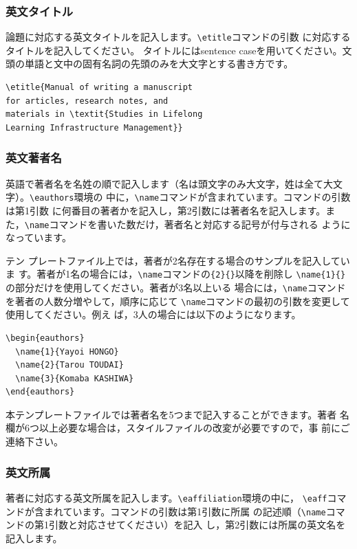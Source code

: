 \documentclass[b5paper,10pt,twocolumn,tombow]{jarticle}
\begin{document}
\subsubsection{英文タイトル}
論題に対応する英文タイトルを記入します。\verb|\etitle|コマンドの引数
に対応するタイトルを記入してください。
タイトルにはsentence caseを用いてください。文頭の単語と文中の固有名詞の先頭のみを大文字とする書き方です。

\begin{verbatim}
\etitle{Manual of writing a manuscript
for articles, research notes, and
materials in \textit{Studies in Lifelong
Learning Infrastructure Management}}
\end{verbatim}

\subsubsection{英文著者名}
英語で著者名を名姓の順で記入します（名は頭文字のみ大文字，姓は全て大文字）。\verb|\eauthors|環境の
中に，\verb|\name|コマンドが含まれています。コマンドの引数は第1引数
に何番目の著者かを記入し，第2引数には著者名を記入します。ま
た，\verb|\name|コマンドを書いた数だけ，著者名と対応する記号が付与される
ようになっています。


テン
プレートファイル上では，著者が2名存在する場合のサンプルを記入していま
す。著者が1名の場合には，\verb|\name|コマンドの\verb|{2}{}|以降を削除し
\verb|\name{1}{}|の部分だけを使用してください。著者が3名以上いる
場合には，\verb|\name|コマンドを著者の人数分増やして，順序に応じて
\verb|\name|コマンドの最初の引数を変更して使用してください。例え
ば，3人の場合には以下のようになります。
\begin{verbatim}
\begin{eauthors}
  \name{1}{Yayoi HONGO}
  \name{2}{Tarou TOUDAI}
  \name{3}{Komaba KASHIWA}
\end{eauthors}
\end{verbatim}
本テンプレートファイルでは著者名を5つまで記入することができます。著者
名欄が6つ以上必要な場合は，スタイルファイルの改変が必要ですので，事
前にご連絡下さい。


\subsubsection{英文所属}
著者に対応する英文所属を記入します。\verb|\eaffiliation|環境の中に，
\verb|\eaff|コマンドが含まれています。コマンドの引数は第1引数に所属
の記述順（\verb|\name|コマンドの第1引数と対応させてください）を記入
し，第2引数には所属の英文名を記入します。
\end{document}
